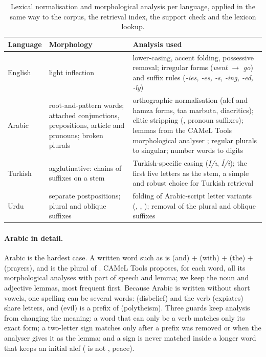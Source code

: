 \begin{table}[ht]
\centering\small
\caption{Lexical normalisation and morphological analysis per language, applied in the same way to the corpus, the
retrieval index, the support check and the lexicon lookup.}
\label{tab:morph}
\begin{tabularx}{\textwidth}{L{1.6cm} L{4.2cm} Y}
\toprule
Language & Morphology & Analysis used \\
\midrule
English & light inflection & lower-casing, accent folding, possessive removal; irregular forms (\emph{went} $\rightarrow$
\emph{go}) and suffix rules (\emph{-ies, -es, -s, -ing, -ed, -ly}) \\
Arabic & root-and-pattern words; attached conjunctions, prepositions, article and pronouns; broken plurals &
orthographic normalisation (alef and hamza forms, taa marbuta, diacritics); clitic stripping (,
pronoun suffixes); lemmas from the CAMeL Tools morphological analyser \cite{camel}; regular plurals to singular; number
words to digits \\
Turkish & agglutinative: chains of suffixes on a stem & Turkish-specific casing (\emph{I/\i}, \emph{\.I/i}); the first five
letters as the stem, a simple and robust choice for Turkish retrieval \\
Urdu & separate postpositions; plural and oblique suffixes & folding of Arabic-script letter variants
(, , ); removal of the plural and oblique suffixes  \\
\bottomrule
\end{tabularx}
\end{table}

\paragraph{Arabic in detail.} Arabic is the hardest case. A written word such as  is  (and) +
 (with) +  (the) +  (prayers), and  is the plural of . CAMeL Tools proposes,
for each word, all its morphological analyses with part of speech and lemma; we keep the noun and adjective lemmas,
most frequent first. Because Arabic is written without short vowels, one spelling can be several words: 
(disbelief) and the verb  (expiates) share letters, and  (evil) is a prefix of  (polytheism).
Three guards keep analysis from changing the meaning: a word that can only be a verb matches only its exact form; a
two-letter sign matches only after a prefix was removed or when the analyser gives it as the lemma; and a sign is never
matched inside a longer word that keeps an initial alef ( is not , peace).

